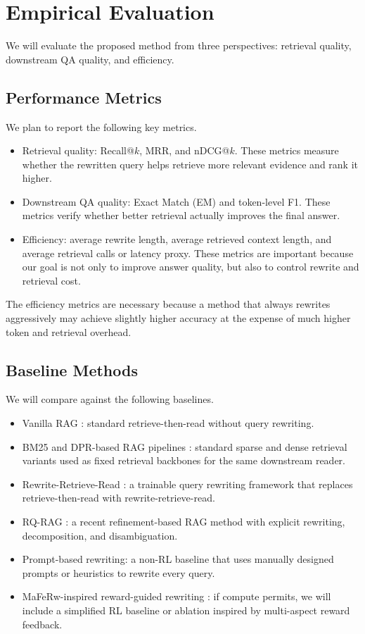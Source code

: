 \section{Empirical Evaluation}
\label{section:evaluation}
We will evaluate the proposed method from three perspectives: retrieval quality, downstream QA quality, and efficiency.

\subsection{Performance Metrics}
We plan to report the following key metrics.
\begin{itemize}
    \item Retrieval quality: Recall@$k$, MRR, and nDCG@$k$. These metrics measure whether the rewritten query helps retrieve more relevant evidence and rank it higher.
    \item Downstream QA quality: Exact Match (EM) and token-level F1. These metrics verify whether better retrieval actually improves the final answer.
    \item Efficiency: average rewrite length, average retrieved context length, and average retrieval calls or latency proxy. These metrics are important because our goal is not only to improve answer quality, but also to control rewrite and retrieval cost.
\end{itemize}
The efficiency metrics are necessary because a method that always rewrites aggressively may achieve slightly higher accuracy at the expense of much higher token and retrieval overhead.

\subsection{Baseline Methods}
We will compare against the following baselines.
\begin{itemize}
    \item Vanilla RAG \citep{lewis2020retrieval}: standard retrieve-then-read without query rewriting.
    \item BM25 and DPR-based RAG pipelines \citep{karpukhin-etal-2020-dense}: standard sparse and dense retrieval variants used as fixed retrieval backbones for the same downstream reader.
    \item Rewrite-Retrieve-Read \citep{ma-etal-2023-query}: a trainable query rewriting framework that replaces retrieve-then-read with rewrite-retrieve-read.
    \item RQ-RAG \citep{chan2024rqrag}: a recent refinement-based RAG method with explicit rewriting, decomposition, and disambiguation.
    \item Prompt-based rewriting: a non-RL baseline that uses manually designed prompts or heuristics to rewrite every query.
    \item MaFeRw-inspired reward-guided rewriting \citep{wang2024maferw}: if compute permits, we will include a simplified RL baseline or ablation inspired by multi-aspect reward feedback.
\end{itemize}

